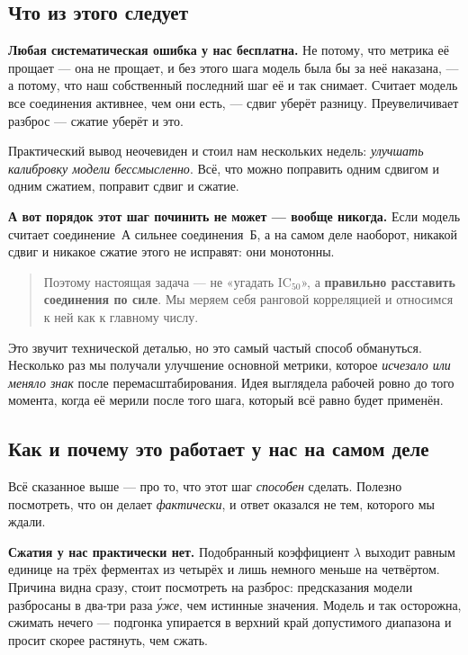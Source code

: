 \documentclass[11pt,a4paper]{article}
\begin{document}
\subsection*{Что из этого следует}

\textbf{Любая систематическая ошибка у нас бесплатна.} Не потому, что метрика её прощает ---
она не прощает, и без этого шага модель была бы за неё наказана, --- а потому, что наш
собственный последний шаг её и так снимает. Считает модель все соединения активнее, чем они
есть, --- сдвиг уберёт разницу. Преувеличивает разброс --- сжатие уберёт и это.

Практический вывод неочевиден и стоил нам нескольких недель: \emph{улучшать калибровку модели
бессмысленно}. Всё, что можно поправить одним сдвигом и одним сжатием, поправит сдвиг и сжатие.

\textbf{А вот порядок этот шаг починить не может --- вообще никогда.} Если модель считает
соединение~А сильнее соединения~Б, а на самом деле наоборот, никакой сдвиг и никакое сжатие
этого не исправят: они монотонны.

\begin{quote}
Поэтому настоящая задача --- не «угадать \textrm{IC}$_{50}$», а \textbf{правильно расставить
соединения по силе}. Мы меряем себя ранговой корреляцией и относимся к ней как к главному
числу.
\end{quote}

Это звучит технической деталью, но это самый частый способ обмануться. Несколько раз мы
получали улучшение основной метрики, которое \emph{исчезало или меняло знак} после
перемасштабирования. Идея выглядела рабочей ровно до того момента, когда её мерили после того
шага, который всё равно будет применён.

\subsection*{Как и почему это работает у нас на самом деле}

Всё сказанное выше --- про то, что этот шаг \emph{способен} сделать. Полезно посмотреть, что
он делает \emph{фактически}, и ответ оказался не тем, которого мы ждали.

\textbf{Сжатия у нас практически нет.} Подобранный коэффициент $\lambda$ выходит равным единице
на трёх ферментах из четырёх и лишь немного меньше на четвёртом. Причина видна сразу, стоит
посмотреть на разброс: предсказания модели разбросаны в два-три раза \emph{у́же}, чем истинные
значения. Модель и так осторожна, сжимать нечего --- подгонка упирается в верхний край
допустимого диапазона и просит скорее растянуть, чем сжать.
\end{document}
